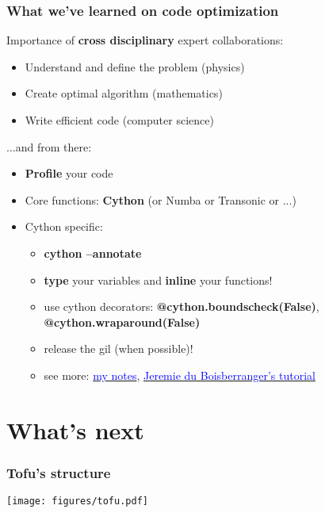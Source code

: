 \documentclass[10pt]{beamer}
\begin{document}
\begin{frame}
\frametitle{What we've learned on code optimization}

Importance of \textbf{cross disciplinary} expert collaborations:

	\begin{itemize}
		\item Understand and define the problem (physics)
		\item Create optimal algorithm (mathematics)
		\item Write efficient code (computer science)
	\end{itemize}

...and from there:

	\begin{itemize}
		\item \textbf{Profile} your code
		\item Core functions: \textbf{Cython} (or Numba or Transonic or ...)
		\item Cython specific:
		\begin{itemize}
			\item \textbf{cython --annotate}
			\item \textbf{type} your variables and \textbf{inline} your functions!
			\item use cython decorators: \textbf{@cython.boundscheck(False)}, \textbf{@cython.wraparound(False)}
			\item release the gil (when possible)!
			\item see more: \href{https://github.com/ToFuProject/tofu/blob/master/Notebooks/Cython_speedup_notes.ipynb}{\textcolor{blue}{my notes}}, \href{https://github.com/jeremiedbb/tutorial-euroscipy-2019}{\textcolor{blue}{Jeremie du Boisberranger's tutorial}}

		\end{itemize}
	\end{itemize}

\end{frame}


\section{What's next}


\begin{frame}
\frametitle{Tofu's structure}

\begin{center}
	\texttt{[image: figures/tofu.pdf]}
\end{center}

\end{frame}
\end{document}
